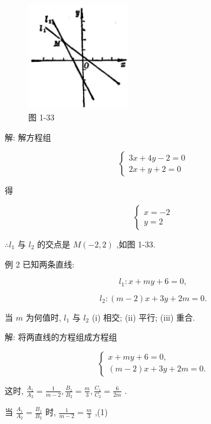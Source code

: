 \documentclass[lang=cn,newtx,10pt,scheme=chinese]{elegantbook}
\begin{document}
\begin{figure}[h]
  \centering
  \includegraphics[max width=0.4\textwidth]{images/01912cc2-ffb6-728e-9ae7-b113ff05c64b_52_702387.jpg}
  \caption{图 1-33}
\end{figure}



解: 解方程组

\[
  \left\{ \begin{array}{l} {3x} + {4y} - 2 = 0 \\ {2x} + y + 2 = 0 \end{array}\right.
\]

得

\[
  \left\{ \begin{array}{l} x = - 2 \\ y = 2 \end{array}\right.
\]

\(\therefore {l}_{1}\) 与 \({l}_{2}\) 的交点是 \(M\left( {-2,2}\right)\) ,如图 1-33.

例 2 已知两条直线:

\[
    {l}_{1} : x + {my} + 6 = 0,
\]

\[
    {l}_{2} : \left( {m - 2}\right) x + {3y} + {2m} = 0.
\]

当 \(m\) 为何值时, \({l}_{1}\) 与 \({l}_{2}\) (i) 相交; (ii) 平行; (iii) 重合.

解: 将两直线的方程组成方程组

\[
  \left\{ \begin{array}{l} x + {my} + 6 = 0, \\ \left( {m - 2}\right) x + {3y} + {2m} = 0. \end{array}\right.
\]

这时, \(\frac{{A}_{1}}{{A}_{2}} = \frac{1}{m - 2},\frac{{B}_{1}}{{B}_{2}} = \frac{m}{3},\frac{{C}_{1}}{{C}_{2}} = \frac{6}{2m}\) .

当 \(\frac{{A}_{1}}{{A}_{2}} = \frac{{B}_{1}}{{B}_{2}}\) 时, \(\frac{1}{m - 2} = \frac{m}{3}\) ,(1)
\end{document}
